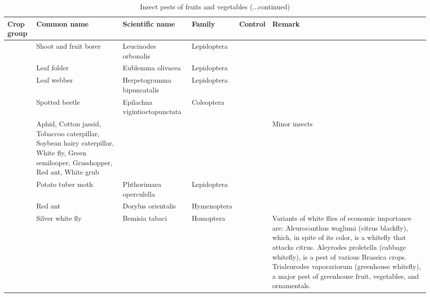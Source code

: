 \documentclass[10pt,dvipsnames,ignorenonframetext,aspectratio=169]{beamer}
\begin{document}
\begin{frame}{}
\protect\hypertarget{section-15}{}
\begin{table}

\caption{\label{tab:unnamed-chunk-3}Insect pests of fruits and vegetables (...continued)}
\centering
\fontsize{4}{6}\selectfont
\begin{tabular}[t]{>{\raggedright\arraybackslash}p{6em}>{\raggedright\arraybackslash}p{12em}>{\raggedright\arraybackslash}p{15em}>{\raggedright\arraybackslash}p{14em}>{\raggedright\arraybackslash}p{6em}>{\raggedright\arraybackslash}p{16em}}
\toprule
Crop group & Common name & Scientific name & Family & Control & Remark\\
\midrule
 & Shoot and fruit borer & Leucinodes orbonalis & Lepidoptera &  & \\
\cmidrule{2-6}
 & Leaf folder & Eublemma olivacea & Lepidoptera &  & \\
\cmidrule{2-6}
 & Leaf webber & Herpetogramma bipuncatalis & Lepidoptera &  & \\
\cmidrule{2-6}
 & Spotted beetle & Epilachna vigintioctopunctata & Coleoptera &  & \\
\cmidrule{2-6}
\multirow{-5}{6em}{\raggedright\arraybackslash Brinjal} & Aphid, Cotton jassid, Tobaccoo caterpillar, Soybean hairy caterpillar, White fly, Green semilooper, Grasshopper, Red ant, White grub &  &  &  & Minor insects\\
\cmidrule{1-6}
 & Potato tuber moth & Phthorimaea operculella & Lepidoptera &  & \\
\cmidrule{2-6}
 & Red ant & Dorylus orientalis & Hymenoptera &  & \\
\cmidrule{2-6}
\multirow{-3}{6em}{\raggedright\arraybackslash Potato} & Silver white fly & Bemisia tabaci & Homoptera &  & Variants of white flies of economic importance are: Aleurocanthus woglumi (citrus blackfly), which, in spite of its color, is a whitefly that attacks citrus. Aleyrodes proletella (cabbage whitefly), is a pest of various Brassica crops. Trialeurodes vaporariorum (greenhouse whitefly), a major pest of greenhouse fruit, vegetables, and ornamentals.\\
\bottomrule
\end{tabular}
\end{table}
\end{frame}
\end{document}
